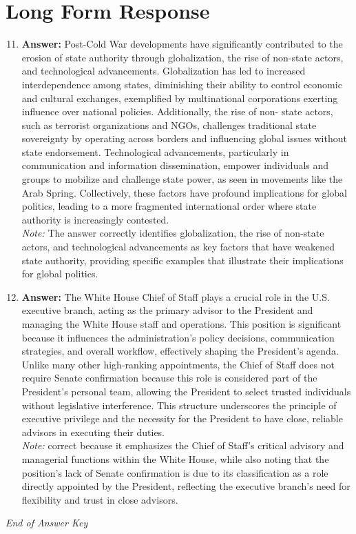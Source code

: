 \documentclass[12pt]{article}
\begin{document}
\section*{Long Form Response}
\begin{enumerate}[label=\arabic*.]
\setcounter{enumi}{10}
\item \textbf{Answer:} Post-Cold War developments have significantly contributed to the erosion of state authority through globalization, the rise of non-state actors, and technological advancements. Globalization has led to increased interdependence among states, diminishing their ability to control economic and cultural exchanges, exemplified by multinational corporations exerting influence over national policies. Additionally, the rise of non- state actors, such as terrorist organizations and NGOs, challenges traditional state sovereignty by operating across borders and influencing global issues without state endorsement. Technological advancements, particularly in communication and information dissemination, empower individuals and groups to mobilize and challenge state power, as seen in movements like the Arab Spring. Collectively, these factors have profound implications for global politics, leading to a more fragmented international order where state authority is increasingly contested.
\\ \textit{Note:} The answer correctly identifies globalization, the rise of non-state actors, and technological advancements as key factors that have weakened state authority, providing specific examples that illustrate their implications for global politics.
\item \textbf{Answer:} The White House Chief of Staff plays a crucial role in the U.S. executive branch, acting as the primary advisor to the President and managing the White House staff and operations. This position is significant because it influences the administration's policy decisions, communication strategies, and overall workflow, effectively shaping the President's agenda. Unlike many other high-ranking appointments, the Chief of Staff does not require Senate confirmation because this role is considered part of the President's personal team, allowing the President to select trusted individuals without legislative interference. This structure underscores the principle of executive privilege and the necessity for the President to have close, reliable advisors in executing their duties.
\\ \textit{Note:} correct because it emphasizes the Chief of Staff's critical advisory and managerial functions within the White House, while also noting that the position's lack of Senate confirmation is due to its classification as a role directly appointed by the President, reflecting the executive branch's need for flexibility and trust in close advisors.
\end{enumerate}

\vfill
\noindent\textit{End of Answer Key}
\end{document}

